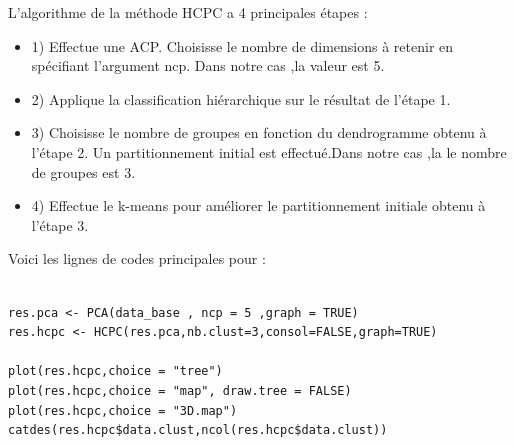 \documentclass[12pt]{article}
\begin{document}
\vspace{0.2 cm}

L'algorithme de la méthode HCPC a 4 principales étapes :

\begin{itemize}
    \item{1)} Effectue une ACP. Choisisse le nombre de dimensions à retenir en spécifiant l’argument ncp. Dans notre cas ,la  valeur est 5.
    \item{2)} Applique la classification hiérarchique sur le résultat de l’étape 1.
    \item{3)} Choisisse le nombre de groupes en fonction du dendrogramme obtenu à l’étape 2. Un partitionnement initial est effectué.Dans notre cas ,la  le nombre de groupes est 3.
    \item{4)} Effectue le k-means pour améliorer le partitionnement initiale obtenu à l’étape 3.
\end{itemize}



Voici les lignes de codes principales pour :


\begin{lstlisting}

res.pca <- PCA(data_base , ncp = 5 ,graph = TRUE)
res.hcpc <- HCPC(res.pca,nb.clust=3,consol=FALSE,graph=TRUE)

plot(res.hcpc,choice = "tree")
plot(res.hcpc,choice = "map", draw.tree = FALSE)
plot(res.hcpc,choice = "3D.map")
catdes(res.hcpc$data.clust,ncol(res.hcpc$data.clust))

\end{lstlisting}
\end{document}
